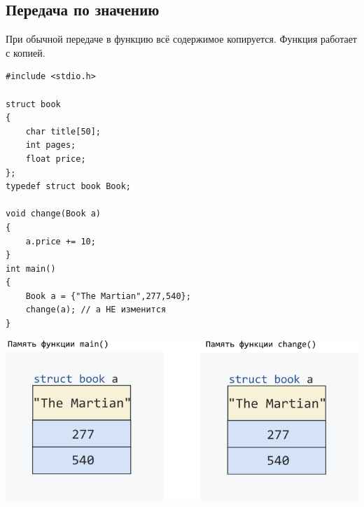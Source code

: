 \documentclass[10pt]{article}
\begin{document}
\subsection*{Передача по значению}
При обычной передаче в функцию всё содержимое копируется. Функция работает с копией.
\begin{multicols}{2}
\begin{lstlisting}
#include <stdio.h>

struct book 
{
    char title[50];
    int pages;
    float price;
};
typedef struct book Book;

void change(Book a) 
{
    a.price += 10;
}
int main()
{
    Book a = {"The Martian",277,540};
    change(a); // a НЕ изменится
}
\end{lstlisting}
\vfill\null
\columnbreak
\vspace*{3\baselineskip}
\begin{center}
\includegraphics[scale=0.5]{../images/structpassbyvalue.png}
\end{center}
\end{multicols}
\end{document}
